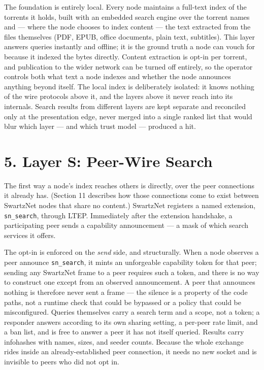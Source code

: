 \documentclass[11pt]{article}
\begin{document}
The foundation is entirely local. Every node maintains a full-text index
of the torrents it holds, built with an embedded search engine over the
torrent names and --- where the node chooses to index content --- the
text extracted from the files themselves (PDF, EPUB, office documents,
plain text, subtitles). This layer answers queries instantly and
offline; it is the ground truth a node can vouch for because it indexed
the bytes directly. Content extraction is opt-in per torrent, and
publication to the wider network can be turned off entirely, so the
operator controls both what text a node indexes and whether the node
announces anything beyond itself. The local index is deliberately
isolated: it knows nothing of the wire protocols above it, and the
layers above it never reach into its internals. Search results from
different layers are kept separate and reconciled only at the
presentation edge, never merged into a single ranked list that would
blur which layer --- and which trust model --- produced a hit.

\hypertarget{layer-s-peer-wire-search}{%
\section{5. Layer S: Peer-Wire Search}\label{layer-s-peer-wire-search}}

The first way a node's index reaches others is directly, over the peer
connections it already has. (Section 11 describes how those connections
come to exist between SwartzNet nodes that share no content.) SwartzNet
registers a named extension, \texttt{sn\_search}, through LTEP.
Immediately after the extension handshake, a participating peer sends a
capability announcement --- a mask of which search services it offers.

The opt-in is enforced on the \emph{send} side, and structurally. When a
node observes a peer announce \texttt{sn\_search}, it mints an
unforgeable capability token for that peer; sending any SwartzNet frame
to a peer requires such a token, and there is no way to construct one
except from an observed announcement. A peer that announces nothing is
therefore never sent a frame --- the silence is a property of the code
paths, not a runtime check that could be bypassed or a policy that could
be misconfigured. Queries themselves carry a search term and a scope,
not a token; a responder answers according to its own sharing setting, a
per-peer rate limit, and a ban list, and is free to answer a peer it has
not itself queried. Results carry infohashes with names, sizes, and
seeder counts. Because the whole exchange rides inside an
already-established peer connection, it needs no new socket and is
invisible to peers who did not opt in.
\end{document}
